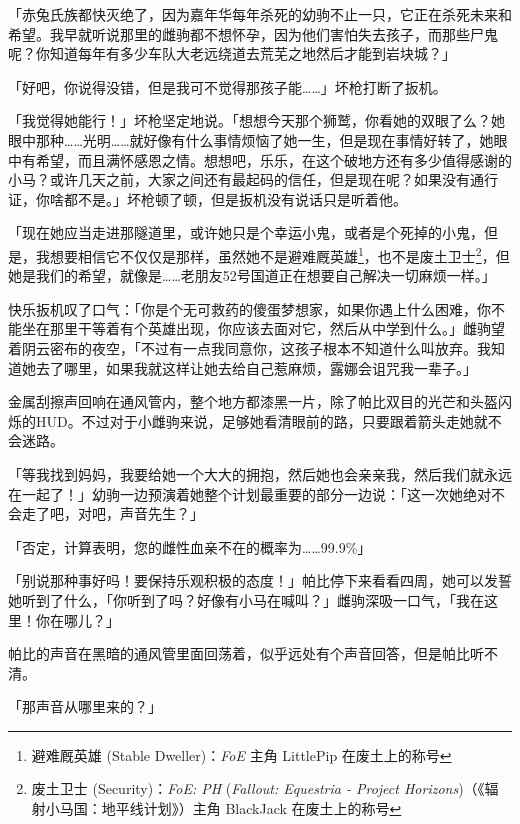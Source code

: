 「赤兔氏族都快灭绝了，因为嘉年华每年杀死的幼驹不止一只，它正在杀死未来和希望。我早就听说那里的雌驹都不想怀孕，因为他们害怕失去孩子，而那些尸鬼呢？你知道每年有多少车队大老远绕道去荒芜之地然后才能到岩块城？」

「好吧，你说得没错，但是我可不觉得那孩子能……」坏枪打断了扳机。

「我觉得她能行！」坏枪坚定地说。「想想今天那个狮鹫，你看她的双眼了么？她眼中那种……光明……就好像有什么事情烦恼了她一生，但是现在事情好转了，她眼中有希望，而且满怀感恩之情。想想吧，乐乐，在这个破地方还有多少值得感谢的小马？或许几天之前，大家之间还有最起码的信任，但是现在呢？如果没有通行证，你啥都不是。」坏枪顿了顿，但是扳机没有说话只是听着他。

「现在她应当走进那隧道里，或许她只是个幸运小鬼，或者是个死掉的小鬼，但是，我想要相信它不仅仅是那样，虽然她不是避难厩英雄\footnote{避难厩英雄 (Stable Dweller)：\emph{FoE} 主角 LittlePip 在废土上的称号}，也不是废土卫士\footnote{废土卫士 (Security)：\emph{FoE: PH} (\emph{Fallout: Equestria - Project Horizons})（《辐射小马国：地平线计划》）主角 BlackJack 在废土上的称号}，但她是我们的希望，就像是……老朋友52号国道正在想要自己解决一切麻烦一样。」

快乐扳机叹了口气：「你是个无可救药的傻蛋梦想家，如果你遇上什么困难，你不能坐在那里干等着有个英雄出现，你应该去面对它，然后从中学到什么。」雌驹望着阴云密布的夜空，「不过有一点我同意你，这孩子根本不知道什么叫放弃。我知道她去了哪里，如果我就这样让她去给自己惹麻烦，露娜会诅咒我一辈子。」

\horizonline


金属刮擦声回响在通风管内，整个地方都漆黑一片，除了帕比双目的光芒和头盔闪烁的HUD。不过对于小雌驹来说，足够她看清眼前的路，只要跟着箭头走她就不会迷路。

「等我找到妈妈，我要给她一个大大的拥抱，然后她也会亲亲我，然后我们就永远在一起了！」幼驹一边预演着她整个计划最重要的部分一边说：「这一次她绝对不会走了吧，对吧，声音先生？」

「{\mt 否定，计算表明，您的雌性血亲不在的概率为……99.9\%}」

「别说那种事好吗！要保持乐观积极的态度！」帕比停下来看看四周，她可以发誓她听到了什么，「你听到了吗？好像有小马在喊叫？」雌驹深吸一口气，「我在这里！你在哪儿？」

帕比的声音在黑暗的通风管里面回荡着，似乎远处有个声音回答，但是帕比听不清。

「那声音从哪里来的？」

